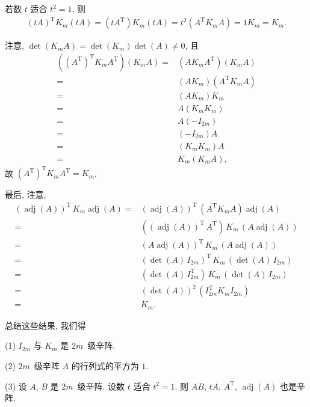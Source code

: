 \documentclass[../libro.tex]{subfiles}
\begin{document}
若数 \(t\) 适合 \(t^2 = 1\),
则
\begin{align*}
    (t A)^{\mathrm{T}} K_m (t A)
    = (t A^{\mathrm{T}}) K_m (t A)
    = t^2 (A^{\mathrm{T}} K_m A)
    = 1 K_m = K_m.
\end{align*}

注意,
\(\det {(K_m A)} = \det {(K_m)} \det {(A)} \neq 0\),
且
\begin{align*}
    ((A^{\mathrm{T}})^{\mathrm{T}} K_m A^{\mathrm{T}})
    (K_m A)
    = {} &
    (A K_m A^{\mathrm{T}})
    (K_m A)
    \\
    = {} &
    (A K_m) (A^{\mathrm{T}} K_m A)
    \\
    = {} &
    (A K_m) K_m
    \\
    = {} &
    A (K_m K_m)
    \\
    = {} &
    A (-I_{2m})
    \\
    = {} &
    {(-I_{2m})} A
    \\
    = {} &
    (K_m K_m) A
    \\
    = {} &
    K_m (K_m A),
\end{align*}
故
\((A^{\mathrm{T}})^{\mathrm{T}} K_m A^{\mathrm{T}} = K_m\).

最后, 注意,
\begin{align*}
    (\operatorname{adj} {(A)})^{\mathrm{T}}\,
    K_m
    \operatorname{adj} {(A)}
    = {} &
    (\operatorname{adj} {(A)})^{\mathrm{T}}\,
    (A^{\mathrm{T}} K_m A)
    \operatorname{adj} {(A)}
    \\
    = {} &
    ((\operatorname{adj} {(A)})^{\mathrm{T}}\, A^{\mathrm{T}})\,
    K_m\,
    (A \operatorname{adj} {(A)})
    \\
    = {} &
    (A \operatorname{adj} {(A)})^{\mathrm{T}}\,
    K_m\,
    (A \operatorname{adj} {(A)})
    \\
    = {} &
    (\det {(A)}\, I_{2m})^{\mathrm{T}}\,
    K_m\,
    (\det {(A)}\, I_{2m})
    \\
    = {} &
    (\det {(A)}\, I_{2m}^{\mathrm{T}})\, K_m\,
    (\det {(A)}\, I_{2m})
    \\
    = {} &
    (\det {(A)})^2\, (I_{2m}^{\mathrm{T}} K_m I_{2m})
    \\
    = {} &
    K_m.
\end{align*}

总结这些结果, 我们得

\begin{theorem}
    (1)
    \(I_{2m}\) 与 \(K_m\) 是 \(2m\)~级辛阵.

    (2)
    \(2m\)~级辛阵 \(A\) 的行列式的平方为 \(1\).

    (3)
    设 \(A\), \(B\) 是 \(2m\)~级辛阵.
    设数 \(t\) 适合 \(t^2 = 1\).
    则 \(AB\), \(tA\),
    \(A^{\mathrm{T}}\),
    \(\operatorname{adj} {(A)}\)
    也是辛阵.
\end{theorem}
\end{document}
